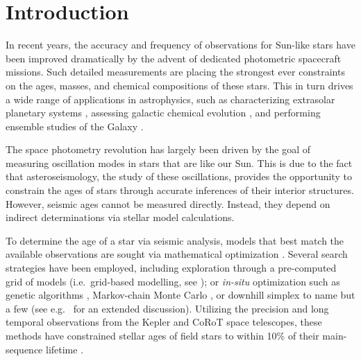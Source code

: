 \documentclass[manuscript]{aastex}
\begin{document}


\section{Introduction}
In recent years, the accuracy and frequency of observations for Sun-like stars have been improved dramatically by the advent of dedicated photometric spacecraft missions. Such detailed measurements are placing the strongest ever constraints on the ages, masses, and chemical compositions of these stars. %
This in turn drives a wide range of applications in astrophysics, such as characterizing extrasolar planetary systems \citep[e.g.][]{2015ApJ...799..170C,2015MNRAS.452.2127S}, assessing galactic chemical evolution \citep[e.g.][]{2015ASSP...39..111C}, and performing ensemble studies of the Galaxy \citep[e.g.][]{2011Sci...332..213C, 2013MNRAS.429..423M, 2014ApJS..210....1C}. 

The space photometry revolution has largely been driven by the goal of measuring oscillation modes in stars that are like our Sun. This is due to the fact that asteroseismology, the study of these oscillations, provides the opportunity to constrain the ages of stars through accurate inferences of their interior structures. However, seismic ages cannot be measured directly. Instead, they depend on indirect determinations via stellar model calculations. 

To determine the age of a star via seismic analysis, models that best match the available observations are sought via mathematical optimization \citep{1994ApJ...427.1013B}. Several search strategies have been employed, including exploration through a pre-computed grid of models (i.e.~grid-based modelling, see \citealt{2011ApJ...730...63G, 2014ApJS..210....1C}); or \emph{in-situ} optimization such as genetic algorithms \citep{2014ApJS..214...27M}, Markov-chain Monte Carlo \citep{2012MNRAS.427.1847B}, or downhill simplex \citep{2013ApJS..208....4P} to name but a few (see e.g.~\citealt{2015MNRAS.452.2127S} for an extended discussion). Utilizing the precision and long temporal observations from the Kepler and CoRoT space telescopes, these methods have constrained stellar ages of field stars to within 10\% of their main-sequence lifetime \citep{2015MNRAS.452.2127S}. 
\end{document}
